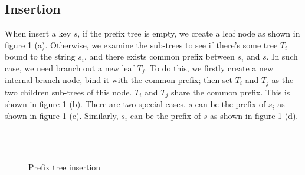 \documentclass[b5paper]{article}
\begin{document}
\subsection{Insertion}

When insert a key $s$, if the prefix tree is empty, we
create a leaf node as shown in figure \ref{fig:patricia-insert} (a).
Otherwise, we examine the sub-trees to see if
there's some tree $T_i$ bound to the string $s_i$,
and there exists common prefix between $s_i$ and $s$. In such case, we
need branch out a new leaf $T_j$. To do this, we firstly
create a new internal branch node, bind it with the common
prefix; then set $T_i$ and $T_j$ as the two children sub-trees of this node.
$T_i$ and $T_j$ share the common
prefix. This is shown in figure \ref{fig:patricia-insert} (b).
There are two special cases. $s$ can be the prefix of $s_i$
as shown in figure \ref{fig:patricia-insert} (c). Similarly,
$s_i$ can be the prefix of $s$ as shown in figure \ref{fig:patricia-insert} (d).

\begin{figure}[htbp]
  \centering
  \hspace{.1\textwidth}
   \\
   \\
  \caption{Prefix tree insertion}
  \label{fig:patricia-insert}
\end{figure}
\end{document}
